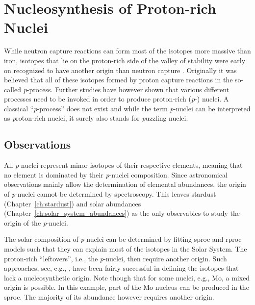 
\chapter{Nucleosynthesis of Proton-rich Nuclei}

While neutron capture reactions can form most of the isotopes more massive than iron, isotopes that lie on the proton-rich side of the valley of stability were early on recognized to have another origin than neutron capture \citep{burbidge57,cameron57}. Originally it was believed that all of these isotopes formed by proton capture reactions in the so-called \emph{p}-process. Further studies have however shown that various different processes need to be invoked in order to produce proton-rich (\textit{p}-) nuclei. A classical ``\textit{p}-process'' does not exist and while the term \textit{p}-nuclei can be interpreted as \textit{p}roton-rich nuclei, it surely also stands for \textit{p}uzzling nuclei.

\section{Observations}\label{sec:p-nuclei:observations}

All \textit{p}-nuclei represent minor isotopes of their respective elements, meaning that no element is dominated by their \textit{p}-nuclei composition. Since astronomical observations mainly allow the determination of elemental abundances, the origin of \textit{p}-nuclei cannot be determined by spectroscopy. This leaves stardust (Chapter~\ref{ch:stardust}) and solar abundances (Chapter~\ref{ch:solar_system_abundances}) as the only observables to study the origin of the \textit{p}-nuclei.

The solar composition of \textit{p}-nuclei can be determined by fitting \ac{sproc} and \ac{rproc} models such that they can explain most of the isotopes in the Solar System. The proton-rich ``leftovers'', i.e., the \textit{p}-nuclei, then require another origin. Such approaches, see, e.g., \citet{bisterzo14}, have been fairly successful in defining the isotopes that lack a nucleosynthetic origin. Note though that for some nuclei, e.g., Mo, a mixed origin is possible. In this example, part of the Mo nucleus can be produced in the \ac{sproc}. The majority of its abundance however requires another origin.

